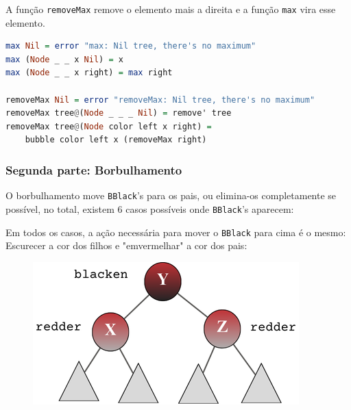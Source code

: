 A função \texttt{removeMax} remove o elemento mais a direita e a função \texttt{max} vira esse elemento.

\begin{lstlisting}[language=Haskell]
max Nil = error "max: Nil tree, there's no maximum"
max (Node _ _ x Nil) = x
max (Node _ _ x right) = max right

removeMax Nil = error "removeMax: Nil tree, there's no maximum"
removeMax tree@(Node _ _ _ Nil) = remove' tree
removeMax tree@(Node color left x right) = 
	bubble color left x (removeMax right)
\end{lstlisting}
\FloatBarrier



\subsubsection{Segunda parte: Borbulhamento}

O borbulhamento move \texttt{BBlack}'s para os pais, ou elimina-os completamente se possível, no total, existem 6 casos possíveis onde \texttt{BBlack}'s aparecem:

\begin{figure}[!ht]
	\centering
\end{figure}
\FloatBarrier

Em todos os casos, a ação necessária para mover o \texttt{BBlack} para cima é o mesmo: Escurecer a cor dos filhos e "emvermelhar" a cor dos pais:

\begin{figure}[!ht]
	\centering
	\includegraphics[scale=0.7]{figures/rubro-negra/bubble.png}
\end{figure}
\FloatBarrier

